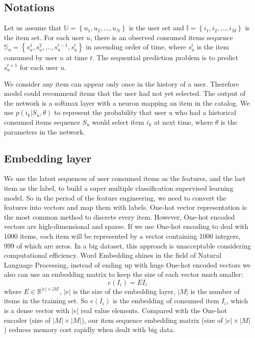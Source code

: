 \documentclass[runningheads]{llncs}
\begin{document}
\subsection{Notations }\label{AA}
Let us assume that $\mathbb{U}= \left \{ u_{1},u_{2},...,u_{N} \right \}\label{eq}$ is the user set and $\mathbb{I}= \left \{ i_{1},i_{2},...,i_{M} \right \}$ is the item set. For each user $u$, there is an observed consumed items sequence $\mathbb{S}_{u}=\left \{ s_{u}^{1},s_{u}^{2},...,s_{u}^{t-1},s_{u}^{t} \right \}$ in ascending order of time, where $s_{u}^{t}$ is the item consumed by user $u$ at time $t$. The sequential prediction problem is to predict $s_{u}^{t+1}$ for each user $u$.

We consider any item can appear only once in the history of a user. Therefore model could recommend items that the user had not yet selected. The output of the network is a softmax layer with a neuron mapping an item in the catalog. We use $p(i_{k}|S_{u},\theta )$ to represent the probability that user $u$ who had a historical consumed items sequence $S_{u}$ would select item $i_{k}$ at next time, where $\theta$ is the parameters in the network.

\subsection{Embedding layer}
 We use the latest sequences of user consumed items as the features, and the last item as the label, to build a super multiple classification supervised learning model. So in the period of the feature engineering, we need to convert the features into vectors and map them with labels. One-hot vector representation is the most common method to discrete every item. However, One-hot encoded vectors are high-dimensional and sparse. If we use One-hot encoding to deal with 1000 items, each item will be represented by a vector containing 1000 integers, 999 of which are zeros. In a big dataset, this approach is unacceptable considering computational efficiency. Word Embedding shines in the field of Natural Language Processing, instead of ending up with huge One-hot encoded vectors we also can use an embedding matrix to keep the size of each vector much smaller:
 \begin{equation}
e(I_{i})=EI_{i}
\end{equation}
where $E\in \mathbb{R}^{|e|\times |M|}$, $|e|$ is the size of the embedding layer, $|M|$ is the number of items in the training set. So $e(I_{i})$ is the embedding of consumed item $I_{i}$, which is a dense vector with $|e|$ real value elements.
Compared with the One-hot encoder (size of $|M|\times|M|$), our item sequence embedding matrix (size of $|e|\times|M|$) reduces memory cost rapidly when dealt with big data.
\end{document}
